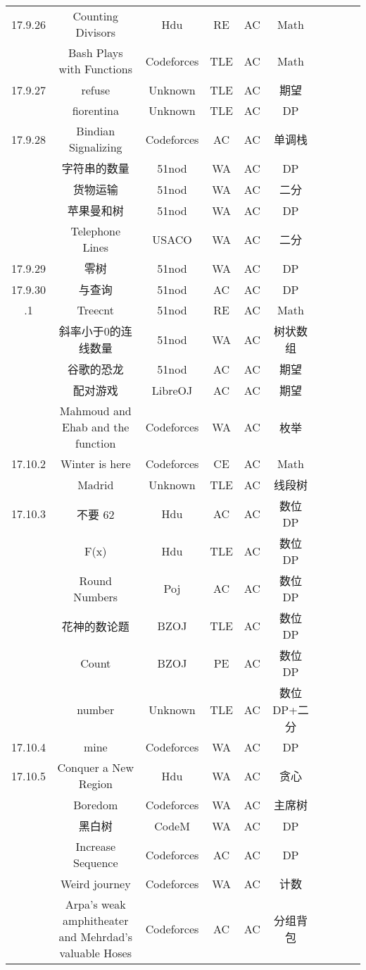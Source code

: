 \documentclass[landscape]{article}
\begin{document}
\begin{longtable}{cccccccccc}
  17.9.26 &Counting Divisors& Hdu &RE &AC& Math\\
  &Bash Plays with Functions &Codeforces &TLE& AC& Math\\
  \hline
  17.9.27 &refuse& Unknown &TLE &AC& 期望\\
  &fiorentina &Unknown& TLE& AC& DP\\
  \hline
  17.9.28 &Bindian Signalizing &Codeforces& AC& AC &单调栈\\
  &字符串的数量 &51nod &WA &AC& DP\\
  &货物运输& 51nod &WA &AC& 二分\\
  &苹果曼和树& 51nod& WA &AC& DP\\
  &Telephone Lines& USACO &WA &AC &二分\\
  \hline
  17.9.29 & 零树& 51nod& WA& AC& DP\\
  \hline
  17.9.30 &与查询 &51nod &AC &AC &DP\\
  \newpage
  \hline
  17.10.1 & Treecnt & 51nod & RE& AC& Math\\
  &斜率小于0的连线数量& 51nod &WA &AC &树状数组\\
  &谷歌的恐龙 &51nod& AC &AC& 期望\\
  &配对游戏& LibreOJ &AC &AC& 期望\\
  &Mahmoud and Ehab and the function& Codeforces &WA& AC& 枚举\\
  \hline
  17.10.2 &Winter is here& Codeforces &CE &AC &Math\\
  &Madrid &Unknown& TLE &AC &线段树\\
  \hline
  17.10.3 &不要 62& Hdu& AC &AC &数位 DP\\
  &F(x)& Hdu &TLE& AC &数位 DP\\
  &Round Numbers& Poj &AC& AC& 数位DP\\
  &花神的数论题 &BZOJ& TLE& AC& 数位DP\\
  &Count &BZOJ &PE& AC& 数位DP\\
  &number &Unknown &TLE &AC& 数位DP+二分\\
  \hline
  17.10.4 &mine& Codeforces &WA &AC &DP\\
  \hline
  17.10.5 &Conquer a New Region &Hdu& WA& AC &贪心\\
  &Boredom& Codeforces& WA &AC& 主席树\\
  &黑白树 &CodeM &WA &AC& DP\\
  &Increase Sequence& Codeforces &AC& AC& DP\\
  &Weird journey &Codeforces &WA &AC& 计数\\
  &Arpa’s weak amphitheater and Mehrdad’s valuable Hoses &Codeforces &AC &AC &分组背包\\

\end{longtable}
\end{document}
